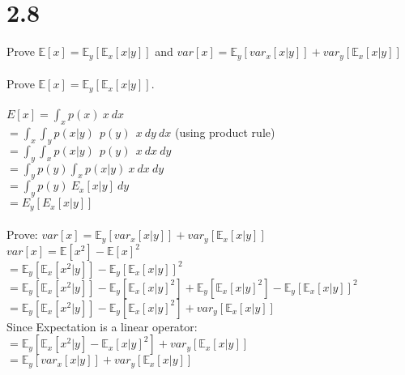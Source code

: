 \documentclass[11pt,leqno,fleqn]{article}
\begin{document}
\section{2.8} Prove $\mathbb{E}[x] = \mathbb{E}_y[\mathbb{E}_x[x|y]]$ and $var[x] = \mathbb{E}_y[var_x[x|y]] + var_y[\mathbb{E}_x[x|y]] $\\
\\
 Prove $\mathbb{E}[x] = \mathbb{E}_y[\mathbb{E}_x[x|y]]$.\\
 \\
 $E[x] = \int_x p(x) \ x \ dx $\\
 $= \int_x \int_y  p(x|y) \ \ p(y) \ \ x \ dy \ dx $ (using product rule)\\
$ = \int_y \int_x  p(x|y) \ \ p(y) \ \ x \ dx \ dy $\\ %
$= \int_ y p(y) \int_x  p(x|y) \ x \ dx \ dy $\\
$ = \int_ y p(y) \  E_x[x|y] \ dy $\\
$ = E_y[E_x[x|y]] $\\
\\
Prove: $var[x] = \mathbb{E}_y[var_x[x|y]] + var_y[\mathbb{E}_x[x|y]] $\\
$ var[x] =  \mathbb{E}[x^2] - \mathbb{E}[x]^2$\\
$=  \mathbb{E}_y[\mathbb{E}_x[x^2|y]] -  \mathbb{E}_y[\mathbb{E}_x[x|y]]^2$\\
$=  \mathbb{E}_y[\mathbb{E}_x[x^2|y]]  -  \mathbb{E}_y[\mathbb{E}_x[x|y]^2] +  \mathbb{E}_y[\mathbb{E}_x[x|y]^2] - \mathbb{E}_y[\mathbb{E}_x[x|y]]^2 $\\
$=  \mathbb{E}_y[\mathbb{E}_x[x^2|y]]  -  \mathbb{E}_y[\mathbb{E}_x[x|y]^2] + var_y[\mathbb{E}_x[x|y]] $\\
Since Expectation is a linear operator:\\
$=  \mathbb{E}_y[\mathbb{E}_x[x^2|y]  -  \mathbb{E}_x[x|y]^2]  + var_y[\mathbb{E}_x[x|y]] $\\
$=  \mathbb{E}_y[var_x[x|y]]  + var_y[\mathbb{E}_x[x|y]] $\\
\end{document}
